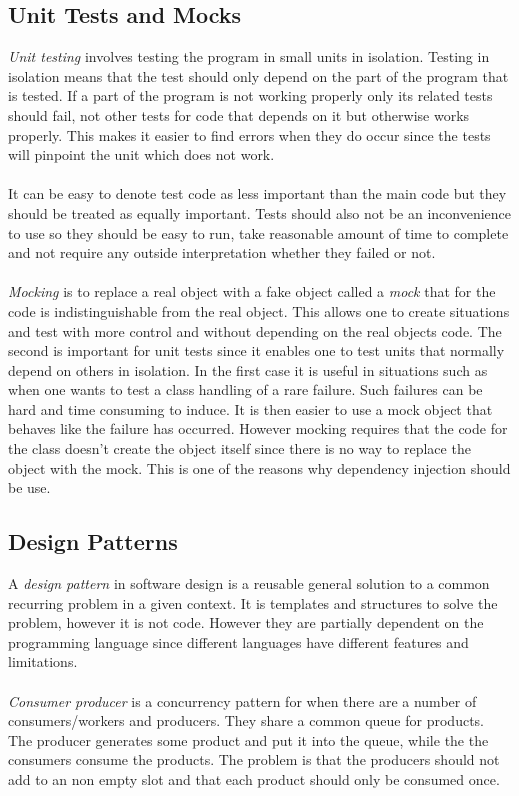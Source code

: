 \documentclass[10pt,a4paper]{report}
\begin{document}
\subsection{Unit Tests and Mocks}
\emph{Unit testing} involves testing the program in small units in isolation. Testing in isolation means that the test should only depend on the part of the program that is tested. If a part of the program is not working properly only its related tests should fail, not other tests for code that depends on it but otherwise works properly. This makes it easier to find errors when they do occur since the tests will pinpoint the unit which does not work.\cite{cleancode2008}\\
\\
It can be easy to denote test code as less important than the main code but they should be treated as equally important. Tests should also not be an inconvenience to use so they should be easy to run, take reasonable amount of time to complete and not require any outside interpretation whether they failed or not.\cite{cleancode2008}\\
\\
\emph{Mocking} is to replace a real object with a fake object called a \emph{mock} that for the code is indistinguishable from the real object. This allows one to create situations and test with more control and without depending on the real objects code. The second is important for unit tests since it enables one to test units that normally depend on others in isolation. In the first case it is useful in situations such as when one wants to test a class handling of a rare failure. Such failures can be hard and time consuming to induce. It is then easier to use a mock object that behaves like the failure has occurred. However mocking requires that the code for the class doesn't create the object itself since there is no way to replace the object with the mock. This is one of the reasons why dependency injection should be use.\cite{cleancode2008}

\subsection{Design Patterns}
A \emph{design pattern} in software design is a reusable general solution to a common recurring problem in a given context. It is templates and structures to solve the problem, however it is not code. However they are partially dependent on the programming language since different languages have different features and limitations.\cite{design_patterns}\\
\\
\emph{Consumer producer} is a concurrency pattern for when there are a number of consumers/workers and producers. They share a common queue for products. The producer generates some product and put it into the queue, while the the consumers consume the products. The problem is that the producers should not add to an non empty slot and that each product should only be consumed once.\cite{cleancode2008, design_patterns}
\end{document}
